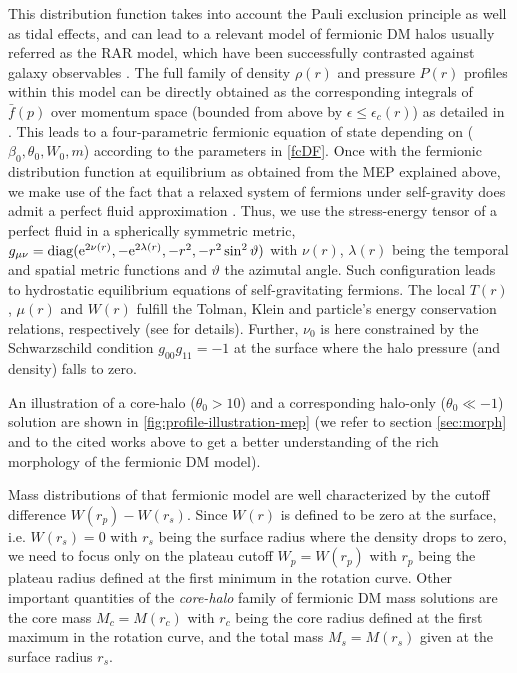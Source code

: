 This distribution function takes into account the Pauli exclusion principle as well as tidal effects, and can lead to a relevant model of fermionic DM halos usually referred as the RAR model, which have been successfully contrasted against galaxy observables \citep{2018PDU....21...82A,2019PDU....24..278A,2020A&A...641A..34B,2021MNRAS.505L..64B,2022MNRAS.511L..35A}. The full family of density $\rho(r)$ and pressure $P(r)$ profiles within this model can be directly obtained as the corresponding integrals of $\bar{f}(p)$ over momentum space (bounded from above by $\epsilon \leq \epsilon_c(r)$) as detailed in \citet{2018PDU....21...82A}. This leads to a four-parametric fermionic equation of state depending on ($\beta_0,\theta_0,W_0,m$) according to the parameters in \cref{fcDF}. Once with the fermionic distribution function at equilibrium as obtained from the MEP explained above, we make use of the fact that a relaxed system of fermions under self-gravity does admit a perfect fluid approximation \citep{1969PhRv..187.1767R}. Thus, we use the stress-energy tensor of a perfect fluid in a spherically symmetric metric, $g_{\mu\nu}=\operatorname{diag}(\mathrm{e}^{2\nu(r)},-\mathrm{e}^{2\lambda(r)},-r^2,-r^2\sin^2\vartheta)$ with $\nu(r)$, $\lambda(r)$ being the temporal and spatial metric functions and $\vartheta$ the azimutal angle. Such configuration leads to hydrostatic equilibrium equations of self-gravitating fermions. The local $T(r)$, $\mu(r)$ and $W(r)$ fulfill the Tolman, Klein and particle's energy conservation relations, respectively (see \citealp{2018PDU....21...82A} for details). Further, $\nu_0$ is here constrained by the Schwarzschild condition $g_{00}g_{11} = -1$ at the surface where the halo pressure (and density) falls to zero.

An illustration of a core-halo ($\theta_0 > 10$) and a corresponding halo-only ($\theta_0 \ll -1$) solution are shown in \cref{fig:profile-illustration-mep} (we refer to section \ref{sec:morph} and to the cited works above to get a better understanding of the rich morphology of the fermionic DM model).


Mass distributions of that fermionic model are well characterized by the cutoff difference $W(r_p) - W(r_s)$. Since $W(r)$ is defined to be zero at the surface, i.e. $W(r_s) = 0$ with $r_s$ being the surface radius where the density drops to zero, we need to focus only on the plateau cutoff $W_p = W(r_p)$ with $r_p$ being the plateau radius defined at the first minimum in the rotation curve. Other important quantities of the \textit{core-halo} family of fermionic DM mass solutions are the core mass $M_c = M(r_c)$ with $r_c$ being the core radius defined at the first maximum in the rotation curve, and the total mass $M_s = M(r_s)$ given at the surface radius $r_s$.

